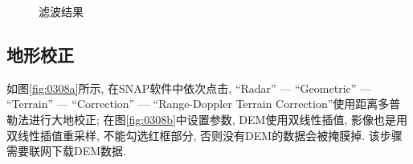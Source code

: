 \begin{figure}[htbp]
    \centering
    \qquad
    \caption{滤波结果}
    \label{fig:0307}
\end{figure}

\subsection{地形校正}

如图\ref{fig:0308a}所示, 在SNAP软件中依次点击, ``Radar'' --- ``Geometric'' --- ``Terrain'' --- ``Correction'' --- ``Range-Doppler Terrain Correction''使用距离多普勒法进行大地校正; 在图\ref{fig:0308b}中设置参数, DEM使用双线性插值, 影像也是用双线性插值重采样, 不能勾选红框部分, 否则没有DEM的数据会被掩膜掉. 该步骤需要联网下载DEM数据. 

